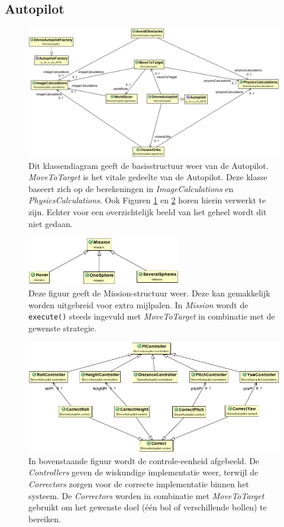 \subsection{Autopilot}
	\begin{figure}[H]
		\centering
		\includegraphics[width=1\textwidth]{AutopilotDiagram.png}
		\caption{Dit klassendiagram geeft de basisstructuur weer van de Autopilot. \textit{MoveToTarget} is het vitale gedeelte van de Autopilot. Deze klasse baseert zich op de berekeningen in \textit{ImageCalculations} en \textit{PhysicsCalculations}. Ook Figuren \ref{fig: mission} en \ref{fig: control} horen hierin verwerkt te zijn. Echter voor een overzichtelijk beeld van het geheel wordt dit niet gedaan. }
	\end{figure}
	\begin{figure}[H]
		\centering
		\includegraphics[width=0.6\textwidth]{MissionDiagram.png}
		\caption{Deze figuur geeft de Mission-structuur weer. Deze kan gemakkelijk worden uitgebreid voor extra mijlpalen. In \textit{Mission} wordt de \texttt{execute()} steeds ingevuld met \textit{MoveToTarget} in combinatie met de gewenste strategie.}
		\label{fig: mission}
	\end{figure}
	\begin{figure}[H]
		\centering
		\includegraphics[width=1\textwidth]{ControlDiagram.png}
		\caption{In bovenstaande figuur wordt de controle-eenheid afgebeeld. De \textit{Controllers} geven de wiskundige implementatie weer, terwijl de \textit{Correctors} zorgen voor de correcte implementatie binnen het systeem. De \textit{Correctors} worden in combinatie met \textit{MoveToTarget} gebruikt om het gewenste doel (één bol of verschillende bollen) te bereiken.}
		\label{fig: control}
	\end{figure}
